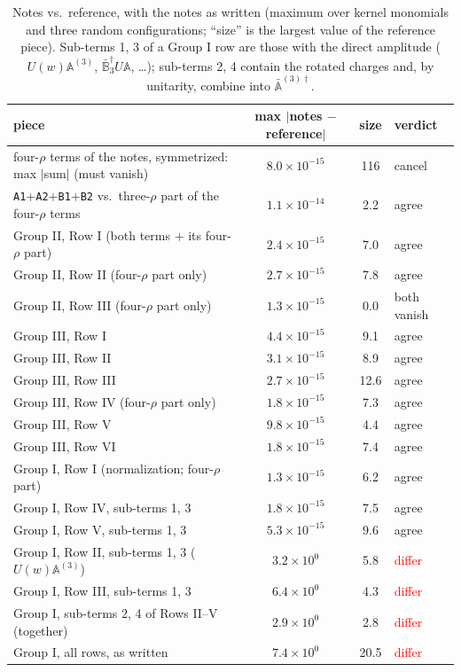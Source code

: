 \documentclass[10pt]{article}
\numberwithin{equation}{section}
\newcommand{\lab}[1]{\texttt{#1}}
\begin{document}
\begin{table}[h]
\centering\small
\begin{tabular}{@{}l c c l@{}}
piece & max $|$notes $-$ reference$|$ & size & verdict\\ \hline
four-$\rho$ terms of the notes, symmetrized: max $|$sum$|$ (must vanish) & $8.0\times10^{-15}$ & 116 & cancel\\
\lab{A1}+\lab{A2}+\lab{B1}+\lab{B2} vs.\ three-$\rho$ part of the four-$\rho$ terms & $1.1\times10^{-14}$ & 2.2 & agree\\
Group II, Row I (both terms + its four-$\rho$ part) & $2.4\times10^{-15}$ & 7.0 & agree\\
Group II, Row II (four-$\rho$ part only) & $2.7\times10^{-15}$ & 7.8 & agree\\
Group II, Row III (four-$\rho$ part only) & $1.3\times10^{-15}$ & 0.0 & both vanish\\
Group III, Row I & $4.4\times10^{-15}$ & 9.1 & agree\\
Group III, Row II & $3.1\times10^{-15}$ & 8.9 & agree\\
Group III, Row III & $2.7\times10^{-15}$ & 12.6 & agree\\
Group III, Row IV (four-$\rho$ part only) & $1.8\times10^{-15}$ & 7.3 & agree\\
Group III, Row V & $9.8\times10^{-15}$ & 4.4 & agree\\
Group III, Row VI & $1.8\times10^{-15}$ & 7.4 & agree\\
Group I, Row I (normalization; four-$\rho$ part) & $1.3\times10^{-15}$ & 6.2 & agree\\
Group I, Row IV, sub-terms 1, 3 & $1.8\times10^{-15}$ & 7.5 & agree\\
Group I, Row V, sub-terms 1, 3 & $5.3\times10^{-15}$ & 9.6 & agree\\
Group I, Row II, sub-terms 1, 3 ($U(w)\mathbb A^{(3)}$) & $3.2\times10^{0}$ & 5.8 & \textcolor{red}{differ}\\
Group I, Row III, sub-terms 1, 3 & $6.4\times10^{0}$ & 4.3 & \textcolor{red}{differ}\\
Group I, sub-terms 2, 4 of Rows II--V (together) & $2.9\times10^{0}$ & 2.8 & \textcolor{red}{differ}\\
Group I, all rows, as written & $7.4\times10^{0}$ & 20.5 & \textcolor{red}{differ}\\
\end{tabular}
\caption{Notes vs.\ reference, with the notes as written (maximum over kernel monomials and three random configurations; ``size'' is the largest value of the reference piece). Sub-terms 1, 3 of a Group I row are those with the direct amplitude ($U(w)\mathbb A^{(3)}$, $\bar{\mathbb B}_3^\dagger U\mathbb A$, \dots); sub-terms 2, 4 contain the rotated charges and, by unitarity, combine into $\bar{\mathbb A}^{(3)\dagger}$.}
\label{C:tab:reference}
\end{table}
\end{document}
